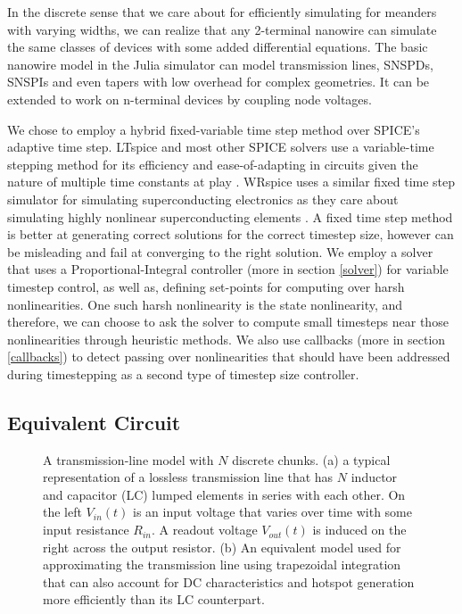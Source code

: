 In the discrete sense that we care about for efficiently simulating for meanders with varying widths,
we can realize that any 2-terminal nanowire can simulate the same classes of devices with some added
differential equations. The basic nanowire model in the Julia simulator can model transmission lines,
SNSPDs, SNSPIs and even tapers with low overhead for complex geometries. It can be extended to work on 
n-terminal devices by coupling node voltages.

We chose to employ a hybrid fixed-variable time step method over SPICE's adaptive time step. 
LTspice and most other SPICE solvers use a variable-time stepping method for its efficiency and ease-of-adapting in circuits
given the nature of multiple time constants at play \cite{spice-book, ltspice-diff-post}.
WRspice uses a 
similar fixed time step simulator for simulating superconducting electronics 
as they care about simulating highly nonlinear superconducting elements
\cite{wrspice}. A fixed time step method is better at generating correct solutions for the
correct timestep size, however can be misleading and fail at converging to the right solution.
We employ a solver that uses a Proportional-Integral controller (more in section \ref{solver})
for variable timestep control, as well as, defining set-points for computing over harsh 
nonlinearities. One such harsh nonlinearity is the state nonlinearity, and therefore, we can
choose to ask the solver to compute small timesteps near those nonlinearities through
heuristic methods. We also use callbacks (more in section \ref{callbacks}) to detect passing
over nonlinearities that should have been addressed during timestepping as a second type
of timestep size controller.

\subsection{Equivalent Circuit}

\begin{figure}
  \centering
  \subfigure[]{
    \label{fig:nw_tline_line}}
  \subfigure[]{
  
    \label{fig:nw_tline_chunk}}
  
  \caption{A transmission-line model with $N$ discrete chunks. (a) a typical representation of a lossless transmission line that has $N$ inductor and capacitor (LC) lumped elements in series with each other. On the left $V_{in}(t)$ is an input voltage that varies over time with some input resistance $R_{in}$. A readout voltage $V_{out}(t)$ is induced on the right across the output resistor. (b) An equivalent model used for approximating the transmission line using trapezoidal integration that can also account for DC characteristics and hotspot generation more
  efficiently than its LC counterpart.}
  \label{fig:nw_tline}
\end{figure}

